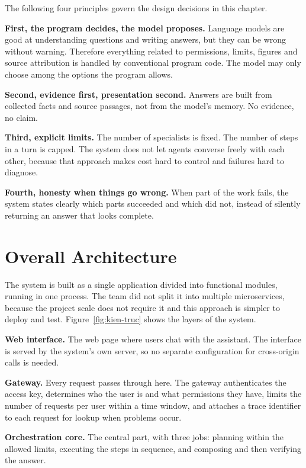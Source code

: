 The following four principles govern the design decisions in this chapter.

\textbf{First, the program decides, the model proposes.} Language models are good at understanding questions and writing answers, but they can be wrong without warning. Therefore everything related to permissions, limits, figures and source attribution is handled by conventional program code. The model may only choose among the options the program allows.

\textbf{Second, evidence first, presentation second.} Answers are built from collected facts and source passages, not from the model's memory. No evidence, no claim.

\textbf{Third, explicit limits.} The number of specialists is fixed. The number of steps in a turn is capped. The system does not let agents converse freely with each other, because that approach makes cost hard to control and failures hard to diagnose.

\textbf{Fourth, honesty when things go wrong.} When part of the work fails, the system states clearly which parts succeeded and which did not, instead of silently returning an answer that looks complete.

\section{Overall Architecture}

The system is built as a single application divided into functional modules, running in one process. The team did not split it into multiple microservices, because the project scale does not require it and this approach is simpler to deploy and test. Figure~\ref{fig:kien-truc} shows the layers of the system.


\textbf{Web interface.} The web page where users chat with the assistant. The interface is served by the system's own server, so no separate configuration for cross-origin calls is needed.

\textbf{Gateway.} Every request passes through here. The gateway authenticates the access key, determines who the user is and what permissions they have, limits the number of requests per user within a time window, and attaches a trace identifier to each request for lookup when problems occur.

\textbf{Orchestration core.} The central part, with three jobs: planning within the allowed limits, executing the steps in sequence, and composing and then verifying the answer.


